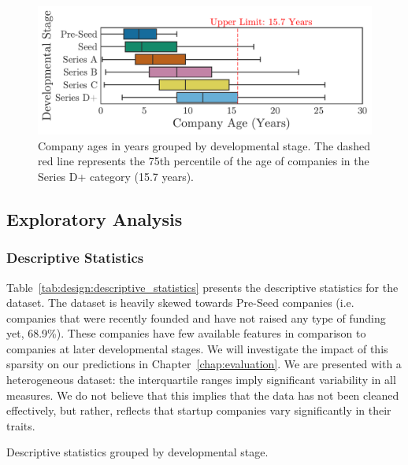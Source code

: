 \documentclass[../thesis/thesis.tex]{subfiles}
\begin{document}
\begin{figure}[!htb]
    \centering
    \includegraphics[width=\textwidth]{../figures/design/descriptives_ages_stage}
    \caption[Company ages by developmental stage]{Company ages in years grouped by developmental stage. The dashed red line represents the 75th percentile of the age of companies in the Series D+ category (15.7 years).}
    \label{fig:design:stages_ages}
\end{figure}

\subsection{Exploratory Analysis}

\subsubsection{Descriptive Statistics}

Table~\ref{tab:design:descriptive_statistics} presents the descriptive statistics for the dataset. The dataset is heavily skewed towards Pre-Seed companies (i.e. companies that were recently founded and have not raised any type of funding yet, 68.9\%). These companies have few available features in comparison to companies at later developmental stages. We will investigate the impact of this sparsity on our predictions in Chapter~\ref{chap:evaluation}. We are presented with a heterogeneous dataset: the interquartile ranges imply significant variability in all measures. We do not believe that this implies that the data has not been cleaned effectively, but rather, reflects that startup companies vary significantly in their traits.

\begin{table}[!htb]
    \centering
    \scalebox{0.9}{}
    \caption[Descriptive statistics by developmental stage]{Descriptive statistics grouped by developmental stage.}
    \label{tab:design:descriptive_statistics}
\end{table}
\end{document}
